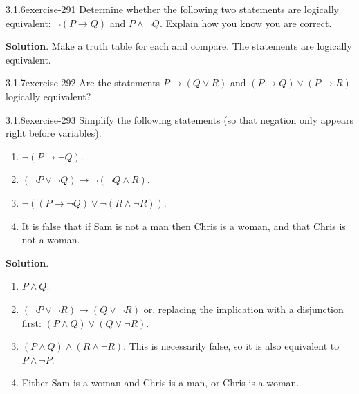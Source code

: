 \documentclass[twoside,11pt,]{book}
\numberwithin{equation}{chapter}
\newcommand{\imp}{\rightarrow}
\begin{document}
\begin{divisionsolution}{3.1.6}{}{exercise-291}%
\hypertarget{p-3942}{}%
Determine whether the following two statements are logically equivalent: \(\neg(P \imp Q)\) and \(P \wedge \neg Q\). Explain how you know you are correct.%
\par\smallskip%
\noindent\textbf{Solution}.\quad%
\hypertarget{p-3943}{}%
Make a truth table for each and compare. The statements are logically equivalent.%
\end{divisionsolution}%
\begin{divisionsolution}{3.1.7}{}{exercise-292}%
\hypertarget{p-3944}{}%
Are the statements \(P \imp (Q\vee R)\) and \((P \imp Q) \vee (P \imp R)\) logically equivalent?%
\end{divisionsolution}%
\begin{divisionsolution}{3.1.8}{}{exercise-293}%
\hypertarget{p-3945}{}%
Simplify the following statements (so that negation only appears right before variables).\leavevmode%
\begin{enumerate}[label=(\alph*)]
\item\hypertarget{li-2058}{}\(\neg(P \imp \neg Q)\).%
\item\hypertarget{li-2059}{}\((\neg P \vee \neg Q) \imp \neg (\neg Q \wedge R)\).%
\item\hypertarget{li-2060}{}\(\neg((P \imp \neg Q) \vee \neg (R \wedge \neg R))\).%
\item\hypertarget{li-2061}{}\hypertarget{p-3946}{}%
It is false that if Sam is not a man then Chris is a woman, and that Chris is not a woman.%
\end{enumerate}
%
\par\smallskip%
\noindent\textbf{Solution}.\quad%
\hypertarget{p-3947}{}%
\leavevmode%
\begin{enumerate}[label=(\alph*)]
\item\hypertarget{li-2062}{}\(P \wedge Q\).%
\item\hypertarget{li-2063}{}\((\neg P \vee \neg R) \imp (Q \vee \neg R)\) or, replacing the implication with a disjunction first: \((P \wedge Q) \vee (Q \vee \neg R)\).%
\item\hypertarget{li-2064}{}\hypertarget{p-3948}{}%
\((P \wedge Q) \wedge (R \wedge \neg R)\). This is necessarily false, so it is also equivalent to \(P \wedge \neg P\).%
\item\hypertarget{li-2065}{}\hypertarget{p-3949}{}%
Either Sam is a woman and Chris is a man, or Chris is a woman.%
\end{enumerate}
%
\end{divisionsolution}%
\end{document}

